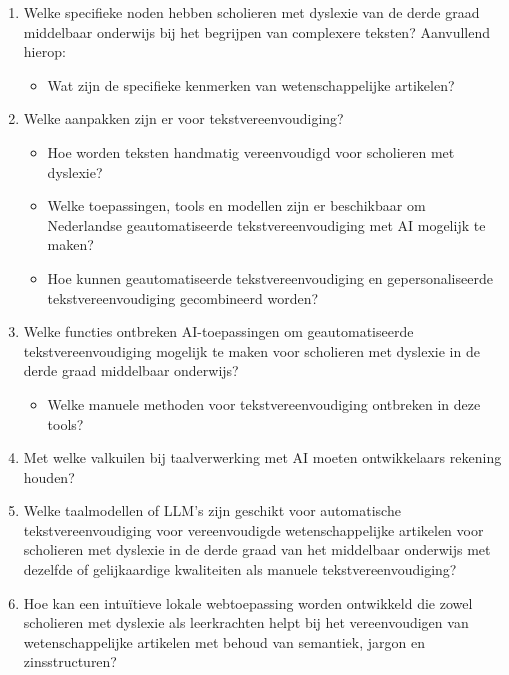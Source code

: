 \begin{enumerate}
	\item Welke specifieke noden hebben scholieren met dyslexie van de derde graad middelbaar onderwijs bij het begrijpen van complexere teksten? Aanvullend hierop: 
	\begin{itemize}
		\item Wat zijn de specifieke kenmerken van wetenschappelijke artikelen?
	\end{itemize} 
	\item Welke aanpakken zijn er voor tekstvereenvoudiging?
	\begin{itemize}
		\item Hoe worden teksten handmatig vereenvoudigd voor scholieren met dyslexie?
		\item Welke toepassingen, tools en modellen zijn er beschikbaar om Nederlandse geautomatiseerde tekstvereenvoudiging met AI mogelijk te maken?
		\item Hoe kunnen geautomatiseerde tekstvereenvoudiging en gepersonaliseerde tekstvereenvoudiging gecombineerd worden?
	\end{itemize}
	\item Welke functies ontbreken AI-toepassingen om geautomatiseerde tekstvereenvoudiging mogelijk te maken voor scholieren met dyslexie in de derde graad middelbaar onderwijs? 
	\begin{itemize}
		\item Welke manuele methoden voor tekstvereenvoudiging ontbreken in deze tools?
	\end{itemize}
	\item Met welke valkuilen bij taalverwerking met AI moeten ontwikkelaars rekening houden?
	\item Welke taalmodellen of LLM's zijn geschikt voor automatische tekstvereenvoudiging voor vereenvoudigde wetenschappelijke artikelen voor scholieren met dyslexie in de derde graad van het middelbaar onderwijs met dezelfde of gelijkaardige kwaliteiten als manuele tekstvereenvoudiging?
	\item Hoe kan een intuïtieve lokale webtoepassing worden ontwikkeld die zowel scholieren met dyslexie als leerkrachten helpt bij het vereenvoudigen van wetenschappelijke artikelen met behoud van semantiek, jargon en zinsstructuren?
\end{enumerate}


\section{}%
\label{sec:onderzoeksdoelstelling}

